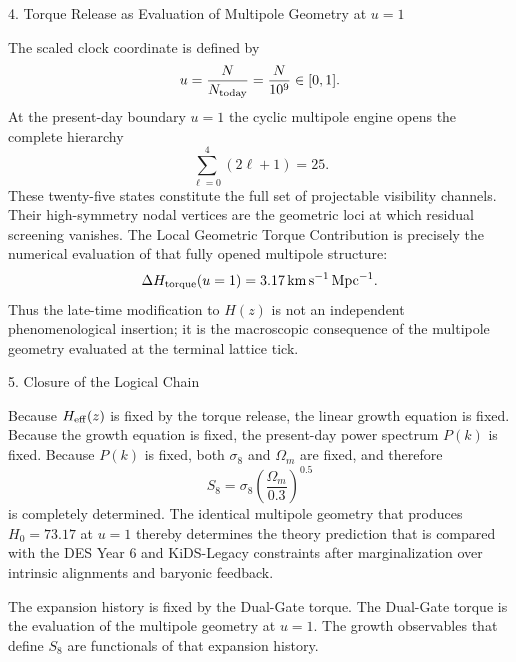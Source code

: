 4. Torque Release as Evaluation of Multipole Geometry at \(u=1\)

The scaled clock coordinate is defined by
\[
u=\frac{N}{N_{\rm today}}=\frac{N}{10^9}\in[0,1].
\]  
At the present-day boundary \(u=1\) the cyclic multipole engine opens the complete hierarchy
\[
\sum_{\ell=0}^{4}(2\ell+1)=25.
\]  
These twenty-five states constitute the full set of projectable visibility channels. Their high-symmetry nodal vertices are the geometric loci at which residual screening vanishes. The Local Geometric Torque Contribution is precisely the numerical evaluation of that fully opened multipole structure:
\[
\Delta H_{\rm torque}(u=1)=3.17\,\mathrm{km\,s^{-1}\,Mpc^{-1}}.
\]  
Thus the late-time modification to \(H(z)\) is not an independent phenomenological insertion; it is the macroscopic consequence of the multipole geometry evaluated at the terminal lattice tick.

5. Closure of the Logical Chain

Because \(H_{\rm eff}(z)\) is fixed by the torque release, the linear growth equation is fixed. Because the growth equation is fixed, the present-day power spectrum \(P(k)\) is fixed. Because \(P(k)\) is fixed, both \(\sigma_8\) and \(\Omega_m\) are fixed, and therefore
\[
S_8=\sigma_8\left(\frac{\Omega_m}{0.3}\right)^{0.5}
\]  
is completely determined. The identical multipole geometry that produces \(H_0=73.17\) at \(u=1\) thereby determines the theory prediction that is compared with the DES Year 6 and KiDS-Legacy constraints after marginalization over intrinsic alignments and baryonic feedback.

The expansion history is fixed by the Dual-Gate torque.  
The Dual-Gate torque is the evaluation of the multipole geometry at \(u=1\).  
The growth observables that define \(S_8\) are functionals of that expansion history.  
